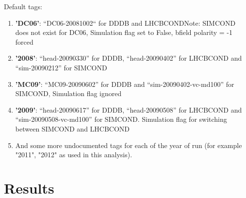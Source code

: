 \documentclass[11pt,a4paper,twoside]{article}
\begin{document}
\begin{enumerate}
        Default tags:
        \begin{enumerate}
            \item \textbf{'DC06'}: “DC06-20081002“ for DDDB and LHCBCONDNote: SIMCOND does not exist for DC06, Simulation flag set to False, bfield polarity = -1 forced
            \item \textbf{'2008'}: “head-20090330” for DDDB, “head-20090402” for LHCBCOND and “sim-20090212” for SIMCOND
            \item \textbf{'MC09'}: “MC09-20090602” for DDDB and “sim-20090402-vc-md100” for SIMCOND, Simulation flag ignored
            \item \textbf{'2009'}: “head-20090617” for DDDB, “head-20090508” for LHCBCOND and “sim-20090508-vc-md100” for SIMCOND. Simulation flag for switching between SIMCOND and LHCBCOND
            \item And some more undocumented tags for each of the year of run (for example "2011", "2012" as used in this analysis).
        \end{enumerate}

        
    \end{enumerate}


\section{Results}
    
\singlespacing
	
	


	
\end{document}
